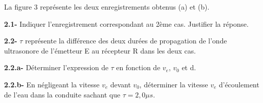\documentclass[12pt, french]{article}
\begin{document}
  La figure 3 représente les deux enregistrements obtenus (a) et (b).

  \textbf{2.1- }Indiquer l’enregistrement correspondant au 2ème cas. Justifier la réponse.

  \textbf{2.2- }$\tau$ représente la différence des deux durées de propagation de l’onde ultrasonore de l’émetteur E au récepteur R dans les deux cas.

  \textbf{2.2.a- }Déterminer l’expression de $\tau$ en fonction de $v_e$, $v_0$ et d.

  \textbf{2.2.b- }En négligeant la vitesse $v_e$ devant $v_0$, déterminer la vitesse $v_e$ d’écoulement de l’eau dans la conduite sachant que $\tau= 2,0 \mu s$.



\end{document}
